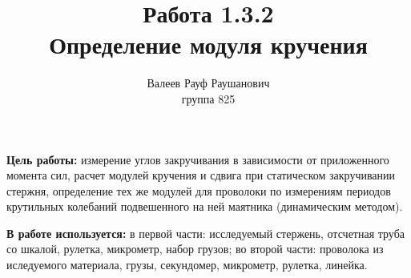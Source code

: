\documentclass[a4paper, 12pt]{article}%
\author{Валеев Рауф Раушанович \\
группа 825}
\title{Работа 1.3.2 \\
Определение модуля кручения}
\begin{document}
\maketitle
\newpage
\textbf{Цель работы:} измерение углов закручивания в зависимости от приложенного момента сил, расчет модулей кручения и сдвига при статическом закручивании стержня, определение тех же модулей для проволоки по измерениям периодов крутильных колебаний подвешенного на ней маятника (динамическим методом).

\textbf{В работе используется:} в первой части: исследуемый стержень, отсчетная труба со шкалой, рулетка, микрометр, набор грузов; во второй части: проволока из иследуемого материала, грузы, секундомер, микрометр, рулетка, линейка.

\end{document}

